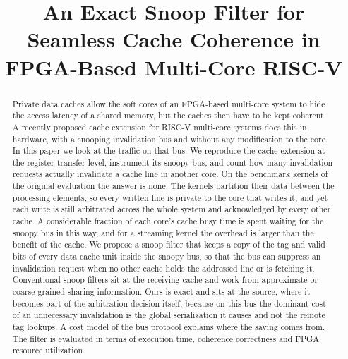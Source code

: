\documentclass[conference]{IEEEtran}
\begin{document}
\title{An Exact Snoop Filter for Seamless Cache Coherence in
FPGA-Based Multi-Core RISC-V}

\ifanon
  \author{}
\else
  \author{
  \and
  }
\fi

\maketitle

\begin{abstract}
Private data caches allow the soft cores of an FPGA-based multi-core system to
hide the access latency of a shared memory, but the caches then have to be kept
coherent. A recently proposed cache extension for RISC-V multi-core systems
does this in hardware, with a snooping invalidation bus and without any
modification to the core. In this paper we look at the traffic on that bus.
We reproduce the cache extension at the register-transfer level, instrument
its snoopy bus, and count how many invalidation requests actually invalidate
a cache line in another core. On the benchmark kernels of the original
evaluation the answer is none. The kernels partition their data between the
processing elements, so every written line is private to the core that writes
it, and yet each write is still arbitrated across the whole system and
acknowledged by every other cache. A considerable fraction of each core's
cache busy time is spent waiting for the snoopy bus in this way, and for a
streaming kernel the overhead is larger than the benefit of the cache. We propose a snoop filter that keeps
a copy of the tag and valid bits of every data cache unit inside the snoopy
bus, so that the bus can suppress an invalidation request when no other cache
holds the addressed line or is fetching it. Conventional snoop filters sit at
the receiving cache and work from approximate or coarse-grained sharing
information. Ours is exact and sits at the source, where it becomes part of
the arbitration decision itself, because on this bus the dominant cost of an
unnecessary invalidation is the global serialization it causes and not the
remote tag lookups. A cost model of the bus protocol explains where the
saving comes from. The filter is evaluated in terms of execution time,
coherence correctness and FPGA resource utilization.
\end{abstract}
\end{document}
